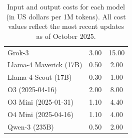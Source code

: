 \documentclass[aps,prd,reprint,superscriptaddress]{revtex4-2}
\begin{document}
\begin{table}[htbp]
\begin{tabular}{|l|c|c|}
Grok-3                             & 3.00   & 15.00 \\
Llama-4 Maverick (17B)             & 0.50   & 2.00    \\
Llama-4 Scout (17B)                & 0.30   & 1.00    \\
O3 (2025-04-16)                    & 2.00   & 8.00  \\
O3 Mini (2025-01-31)               & 1.10   & 4.40  \\
O4 Mini (2025-04-16)               & 1.10   & 4.00  \\
Qwen-3 (235B)                      & 0.50   & 2.00    \\
\hline
\end{tabular}
\caption{Input and output costs for each model (in US dollars per 1M tokens). All cost values reflect the most recent updates as of October 2025.}\label{tab:model_api_cost}
\end{table}




\end{document}
